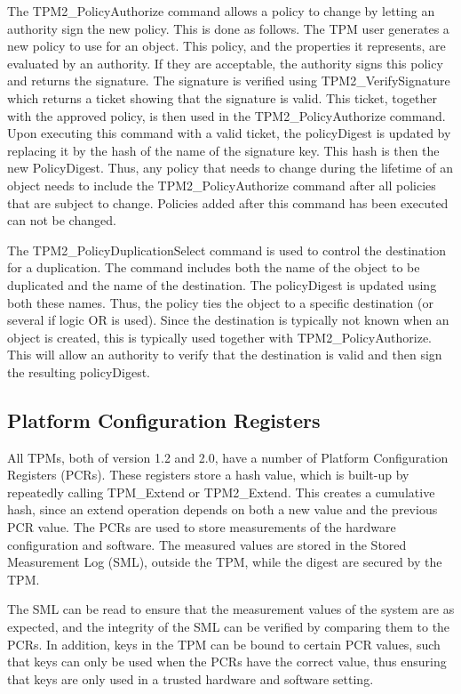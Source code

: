{The TPM2\_PolicyAuthorize command allows a policy to change by letting an authority sign the new policy. This is done as follows. The TPM user generates a new policy to use for an object. This policy, and the properties it represents, are evaluated by an authority. If they are acceptable, the authority signs this policy and returns the signature. The signature is verified using TPM2\_VerifySignature which returns a ticket showing that the signature is valid. This ticket, together with the approved policy, is then used in the TPM2\_PolicyAuthorize command. Upon executing this command with a valid ticket, the policyDigest is updated by replacing it by the hash of the name of the signature key. This hash is then the new PolicyDigest. Thus, any policy that needs to change during the lifetime of an object needs to include the TPM2\_PolicyAuthorize command after all policies that are subject to change. Policies added after this command has been executed can not be changed.
 
The TPM2\_PolicyDuplicationSelect command is used to control the destination for a duplication. The command includes both the name of the object to be duplicated and the name of the destination. The policyDigest is updated using both these names. Thus, the policy ties the object to a specific destination (or several if logic OR is used). Since the destination is typically not known when an object is created, this is typically used together with TPM2\_PolicyAuthorize. This will allow an authority to verify that the destination is valid and then sign the resulting policyDigest.

\subsection{Platform Configuration Registers}
All TPMs, both of version 1.2 and 2.0, have a number of Platform Configuration Registers (PCRs). These registers store a hash value, which is built-up by repeatedly calling TPM\_Extend or TPM2\_Extend. This creates a cumulative hash, since an extend operation depends on both a new value and the previous PCR value. The PCRs are used to store measurements of the hardware configuration and software. The measured values are stored in the Stored Measurement Log (SML), outside the TPM, while the digest are secured by the TPM.

The SML can be read to ensure that the measurement values of the system are as expected, and the integrity of the SML can be verified by comparing them to the PCRs. In addition, keys in the TPM can be bound to certain PCR values, such that keys can only be used when the PCRs have the correct value, thus ensuring that keys are only used in a trusted hardware and software setting.

}
